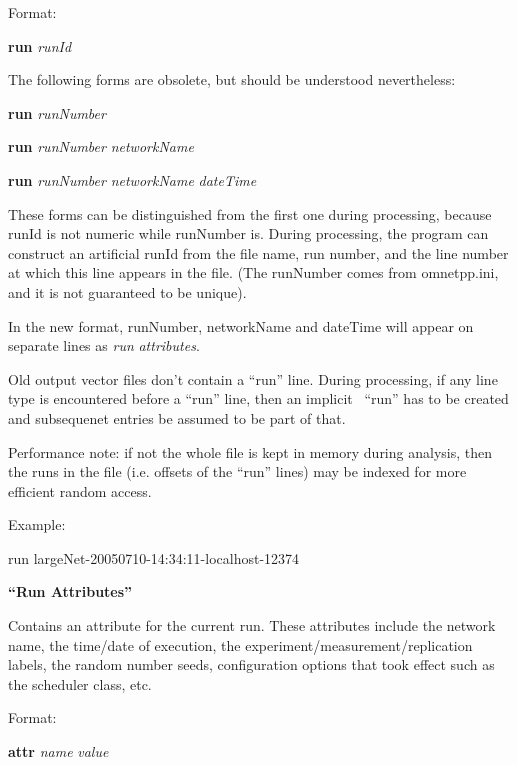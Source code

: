 \bigskip

Format:

\textbf{run} \textit{runId}


\bigskip

The following forms are obsolete, but should be understood nevertheless:

\textbf{run} \textit{runNumber}

\textbf{run} \textit{runNumber} \textit{networkName}

\textbf{run} \textit{runNumber} \textit{networkName} \textit{dateTime}


\bigskip

These forms can be distinguished from the first one during processing,
because runId is not numeric while runNumber is. During processing, the
program can construct an artificial runId from the file name, run
number, and the line number at which this line appears in the file.
(The runNumber comes from omnetpp.ini, and it is not guaranteed to be
unique).

In the new format, runNumber, networkName and dateTime will appear on
separate lines as \textit{run} \textit{attributes}.


\bigskip

Old output vector files don't contain a ``run'' line. During processing,
if any line type is encountered before a ``run'' line, then an implicit
\ ``run'' has to be created and subsequenet entries be assumed to be
part of that.


\bigskip

Performance note: if not the whole file is kept in memory during
analysis, then the runs in the file (i.e. offsets of the ``run'' lines)
may be indexed for more efficient random access.


\bigskip

Example:

{\ttfamily
run
{\textquotedbl}largeNet{}-20050710{}-14:34:11{}-localhost{}-12374{\textquotedbl}}


\bigskip

{\bfseries
``Run Attributes''}

Contains an attribute for the current run. These attributes include the
network name, the time/date of execution, the
experiment/measurement/replication labels, the random number seeds,
configuration options that took effect such as the scheduler class,
etc.


\bigskip

Format:

\textbf{attr} \textit{name} \textit{value}


